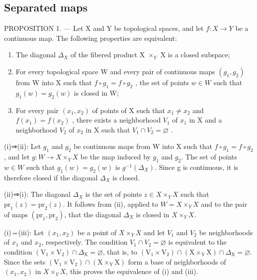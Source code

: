 \subsection{Separated maps}

PROPOSITION 1. --- Let X and Y be topological spaces, and let \(f\colon X \to Y\) be a continuous map. The following properties are equivalent:

\begin{enumerate}
\def\labelenumi{(\roman{enumi})}
\item
  The diagonal \(\Delta_{X}\) of the fibered product X \(\times_{Y}\) X is a closed subspace;
\item
  For every topological space W and every pair of continuous maps \((g_{1}, g_{2})\) from W into X such that \(f \circ g_{1} = f \circ g_{2}\) , the set of points \(w \in W\) such that \(g_{1}(w) = g_{2}(w)\) is closed in W;
\item
  For every pair \((x_{1}, x_{2})\) of points of X such that \(x_{1} \neq x_{2}\) and \(f(x_{1}) = f(x_{2})\) , there exists a neighborhood \(V_{1}\) of \(x_{1}\) in X and a neighborhood \(V_{2}\) of \(x_{2}\) in X such that \(V_{1} \cap V_{2} = \varnothing\) .
\end{enumerate}

(i)⇒(ii): Let \(g_{1}\) and \(g_{2}\) be continuous maps from W into X such that \(f \circ g_{1} = f \circ g_{2}\), and let \(g: W \to X \times_{Y} X\) be the map induced by \(g_{1}\) and \(g_{2}\). The set of points \(w \in W\) such that \(g_{1}(w) = g_{2}(w)\) is \(g^{-1}(\Delta_{X})\). Since g is continuous, it is therefore closed if the diagonal \(\Delta_{X}\) is closed.

(ii)⇒(i): The diagonal \(\Delta_{X}\) is the set of points \(z \in X \times_{Y} X\) such that \(\mathrm{pr}_{1}(z) = \mathrm{pr}_{2}(z)\). It follows from (ii), applied to \(W = X \times_{Y} X\) and to the pair of maps \((\mathrm{pr}_{1}, \mathrm{pr}_{2})\), that the diagonal \(\Delta_{X}\) is closed in \(X \times_{Y} X\).

(i)⇔(iii): Let \((x_{1}, x_{2})\) be a point of \(X \times_{Y} X\) and let \(V_{1}\) and \(V_{2}\) be neighborhoods of \(x_{1}\) and \(x_{2}\), respectively. The condition \(V_{1} \cap V_{2} = \varnothing\) is equivalent to the condition \((\mathrm{V}_{1} \times \mathrm{V}_{2}) \cap \Delta_{\mathrm{X}} = \varnothing\), that is, to \((\mathrm{V}_{1} \times \mathrm{V}_{2}) \cap (\mathrm{X} \times_{\mathrm{Y}} \mathrm{X}) \cap \Delta_{\mathrm{X}} = \varnothing\). Since the sets \((\mathrm{V}_{1} \times \mathrm{V}_{2}) \cap (\mathrm{X} \times_{\mathrm{Y}} \mathrm{X})\) form a base of neighborhoods of \((x_{1}, x_{2})\) in \(X \times_{Y} X\), this proves the equivalence of (i) and (iii).

